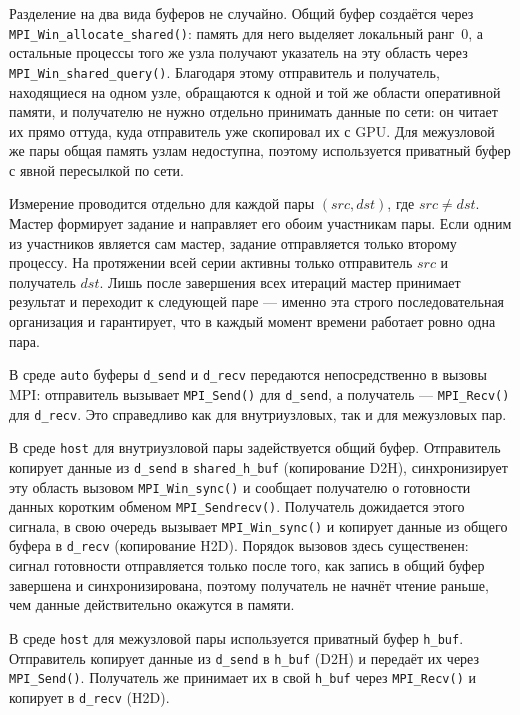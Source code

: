 \documentclass[a4paper,14pt]{extarticle}
\begin{document}
Разделение на два вида буферов не случайно. Общий буфер создаётся через \texttt{MPI\_Win\_allocate\_shared()}: память для него выделяет локальный ранг~0, а остальные процессы того же узла получают указатель на эту область через \texttt{MPI\_Win\_shared\_query()}. Благодаря этому отправитель и получатель, находящиеся на одном узле, обращаются к одной и той же области оперативной памяти, и получателю не нужно отдельно принимать данные по сети: он читает их прямо оттуда, куда отправитель уже скопировал их с GPU. Для межузловой же пары общая память узлам недоступна, поэтому используется приватный буфер с явной пересылкой по сети.
 
Измерение проводится отдельно для каждой пары \((src, dst)\), где \(src \ne dst\). Мастер формирует задание и направляет его обоим участникам пары. Если одним из участников является сам мастер, задание отправляется только второму процессу. На протяжении всей серии активны только отправитель \(src\) и получатель \(dst\). Лишь после завершения всех итераций мастер принимает результат и переходит к следующей паре --- именно эта строго последовательная организация и гарантирует, что в каждый момент времени работает ровно одна пара.
 
В среде \texttt{auto} буферы \texttt{d\_send} и \texttt{d\_recv} передаются непосредственно в вызовы MPI: отправитель вызывает \texttt{MPI\_Send()} для \texttt{d\_send}, а получатель --- \texttt{MPI\_Recv()} для \texttt{d\_recv}. Это справедливо как для внутриузловых, так и для межузловых пар.
 
В среде \texttt{host} для внутриузловой пары задействуется общий буфер. Отправитель копирует данные из \texttt{d\_send} в \texttt{shared\_h\_buf} (копирование D2H), синхронизирует эту область вызовом \texttt{MPI\_Win\_sync()} и сообщает получателю о готовности данных коротким обменом \texttt{MPI\_Sendrecv()}. Получатель дожидается этого сигнала, в свою очередь вызывает \texttt{MPI\_Win\_sync()} и копирует данные из общего буфера в \texttt{d\_recv} (копирование H2D). Порядок вызовов здесь существенен: сигнал готовности отправляется только после того, как запись в общий буфер завершена и синхронизирована, поэтому получатель не начнёт чтение раньше, чем данные действительно окажутся в памяти.
 
В среде \texttt{host} для межузловой пары используется приватный буфер \texttt{h\_buf}. Отправитель копирует данные из \texttt{d\_send} в \texttt{h\_buf} (D2H) и передаёт их через \texttt{MPI\_Send()}. Получатель же принимает их в свой \texttt{h\_buf} через \texttt{MPI\_Recv()} и копирует в \texttt{d\_recv} (H2D).
 
\end{document}
